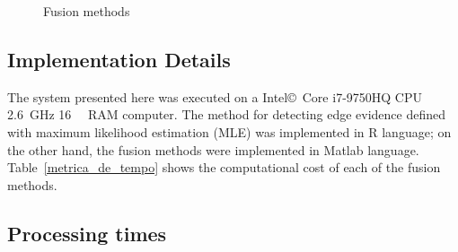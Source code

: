 \documentclass[journal]{IEEEtran}
\begin{document}
\begin{figure}[hbt]
{     }
     \caption{Fusion methods}
     \label{fusion_met}
\end{figure}

\subsection{Implementation Details}
The system presented here was executed on a Intel\copyright\ Core i7-9750HQ CPU \SI{2.6}{\giga\hertz} \SI{16}{\giga\byte} RAM computer.  
The method for detecting edge evidence defined with maximum likelihood estimation (MLE) was implemented in R language; on the other hand, the fusion methods were implemented in Matlab language. 
Table~\ref{metrica_de_tempo} shows the computational cost of each of the fusion methods.

\subsection{Processing times} 
\end{document}
